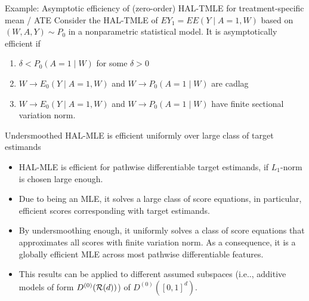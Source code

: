 \documentclass[t]{beamer}
\begin{document}
\begin{frame}{Example: Asymptotic  efficiency of (zero-order) HAL-TMLE for treatment-specific mean / ATE}
Consider the HAL-TMLE of $EY_1=EE(Y\mid A=1,W)$ based on $(W,A,Y)\sim P_0$ in a nonparametric statistical model.
\vspace{0.15in}
It is asymptotically efficient if
\begin{enumerate}
\item $\delta<P_0(A=1\mid W)$ for some $\delta>0$
\item $W\rightarrow E_0(Y\mid A=1,W)$  and $W\rightarrow P_0(A=1\mid W)$ are cadlag
\item $W\rightarrow E_0(Y\mid A=1,W)$  and $W\rightarrow P_0(A=1\mid W)$ have finite sectional variation norm.
\end{enumerate}
\end{frame}

\begin{frame}{Undersmoothed HAL-MLE   is efficient uniformly over large class of target estimands}
\begin{itemize}
\item HAL-MLE is efficient for pathwise differentiable target estimands, if $L_1$-norm is chosen large enough.
\item Due to being an MLE, it solves a large class of score equations, in particular, efficient scores corresponding with target estimands.
\item By undersmoothing enough, it uniformly solves a class of score equations that approximates all scores with finite variation norm. As a consequence, it is a globally efficient MLE across most pathwise differentiable features.
\item This results can be applied to different assumed subspaces (i.e.., additive models of form $D^{(0)}({\cal R}(d))$) of $D^{(0)}([0,1]^d)$.
\end{itemize}
\end{frame}
\end{document}
